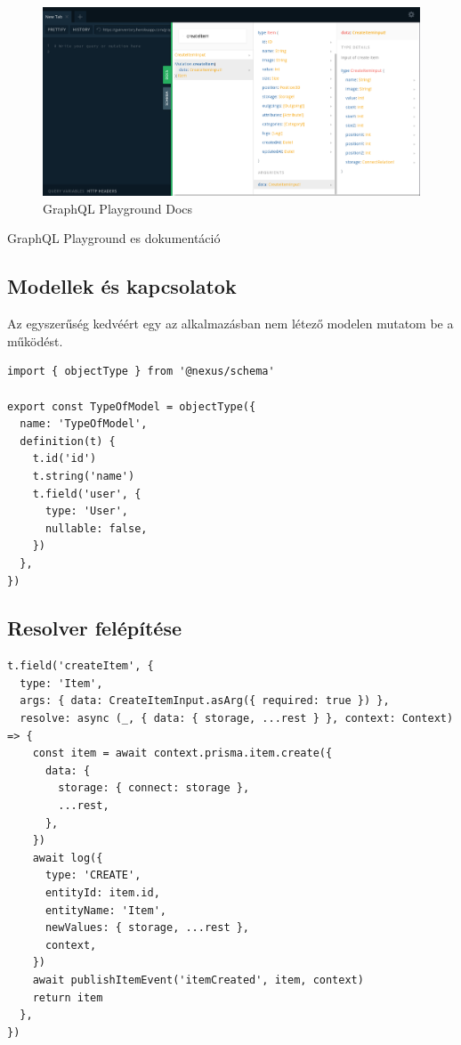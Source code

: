 \begin{figure}[!ht]
  \centering
  \includegraphics[width=150mm, keepaspectratio]{figures/playground_docs.png}
  \caption{GraphQL Playground Docs}
  \label{fig:playgroundDocs}
\end{figure}
GraphQL Playground es dokumentáció

\subsection{Modellek és kapcsolatok}
Az egyszerűség kedvéért egy az alkalmazásban nem létező modelen mutatom be a működést.

\begin{lstlisting}[style=ES6, caption={Példa model}]
import { objectType } from '@nexus/schema'

export const TypeOfModel = objectType({
  name: 'TypeOfModel',
  definition(t) {
    t.id('id')
    t.string('name')
    t.field('user', {
      type: 'User',
      nullable: false,
    })
  },
})
\end{lstlisting}

\subsection{Resolver felépítése}


\begin{lstlisting}[style=ES6, caption={Eszköz létrehozás resolver}]
t.field('createItem', {
  type: 'Item',
  args: { data: CreateItemInput.asArg({ required: true }) },
  resolve: async (_, { data: { storage, ...rest } }, context: Context) => {
    const item = await context.prisma.item.create({
      data: {
        storage: { connect: storage },
        ...rest,
      },
    })
    await log({
      type: 'CREATE',
      entityId: item.id,
      entityName: 'Item',
      newValues: { storage, ...rest },
      context,
    })
    await publishItemEvent('itemCreated', item, context)
    return item
  },
})
\end{lstlisting}

